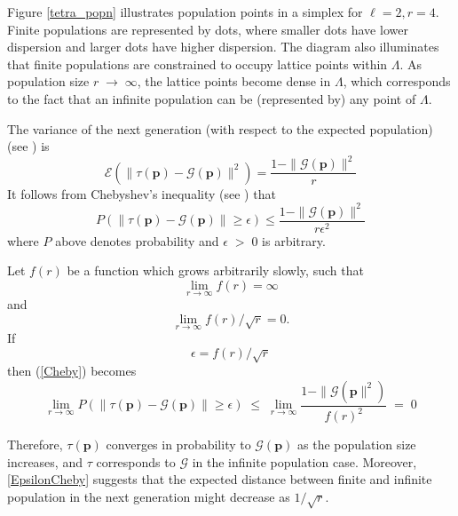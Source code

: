 Figure \ref{tetra_popn} illustrates population points in a simplex for $\ell  =  2,  r  =  4$. 
Finite populations are represented by dots, 
where smaller dots have lower dispersion and larger dots have higher dispersion. 
The diagram also illuminates that finite populations are constrained to occupy lattice points 
within $\Lambda$. As population size $r \;\to\; \infty$, the lattice points become dense in $\Lambda$, 
which corresponds to the fact that an infinite population can be (represented by) any point of $\Lambda$.  

The variance of the next generation (with respect to the expected population) (see \cite{Vose1999}) is 
\begin{equation}
\label{RHSvariance}
\mathcal{E}(\| \tau (\bm{p}) - \mathcal{G}(\bm{p}) \|^2) = \frac{1 - \|\mathcal{G}(\bm{p})\|^2}{r}
\end{equation}
It follows from Chebyshev's inequality (see \cite{ChebyshevInequality}) that 
\begin{equation}
\label{Cheby}
P(\| \tau (\bm{p}) - \mathcal{G}(\bm{p}) \| \geq \epsilon) \leq \frac{1 - \|\mathcal{G}(\bm{p})\|^2} {r{\epsilon}^2}
\end{equation}
where $P$ above denotes probability and $\epsilon \;>\; 0$ is arbitrary.

Let $f(r)$ be a function which grows arbitrarily slowly, such that 
\[
\lim_{r \to \infty} f(r)  =  \infty
\]
and
\[
\lim_{r \to \infty} f(r)/\sqrt{r}  =  0.
\]
If 
\begin{equation}
\label{EpsilonCheby}
\epsilon  =  f(r)/\sqrt{r}
\end{equation}
then (\ref{Cheby}) becomes
\begin{equation*}
\lim_{r \to \infty} P(\| \tau (\bm{p}) - \mathcal{G}(\bm{p}) \| \geq \epsilon) \; \leq \; \lim_{r \to \infty}\frac{1 - \|\mathcal{G}(\bm{p}\|^2)} {{f(r)}^2} \; = \; 0
\end{equation*}

Therefore, $\tau(\bm{p})$ converges in probability to $\mathcal{G}(\bm{p})$ as the population size increases, 
and $\tau$ corresponds to $\mathcal{G}$ 
in the infinite population case. Moreover, \ref{EpsilonCheby} suggests that the expected distance between finite and 
infinite population in the next generation might decrease as $1/\sqrt{r}$.

